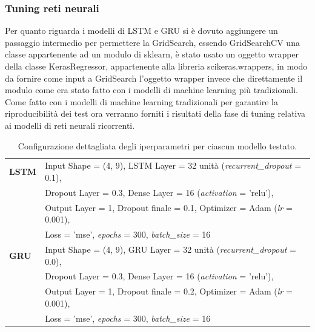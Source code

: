 \subsubsection{Tuning reti neurali}
Per quanto riguarda i modelli di LSTM e GRU si è dovuto aggiungere un passaggio intermedio per permettere la GridSearch, essendo GridSearchCV una classe appartenente ad un modulo di sklearn, è stato usato un oggetto wrapper della classe KerasRegressor, appartenente alla libreria scikeras.wrappers, in modo da fornire come input a GridSearch l'oggetto wrapper invece che direttamente il modulo come era stato fatto con i modelli di machine learning più tradizionali.\\
Come fatto con i modelli di machine learning tradizionali per garantire la riproducibilità dei test ora verranno forniti i risultati della fase di tuning relativa ai modelli di reti neurali ricorrenti.\\
\begin{table}[H]
	\centering
	\caption{Configurazione dettagliata degli iperparametri per ciascun modello testato.}
	\label{tab:Iperparametri_RNN}
	\small %
	\begin{tabular}{ll}
		\toprule
		\textbf{LSTM} & Input Shape = (4, 9), LSTM Layer = 32 unità (\textit{recurrent\_dropout} = 0.1), \\
		& Dropout Layer = 0.3, Dense Layer = 16 (\textit{activation} = 'relu'), \\
		& Output Layer = 1, Dropout finale = 0.1, Optimizer = Adam (\textit{lr} = 0.001), \\
		& Loss = 'mse', \textit{epochs} = 300, \textit{batch\_size} = 16 \\ 
		\midrule
		\textbf{GRU}  & Input Shape = (4, 9), GRU Layer = 32 unità (\textit{recurrent\_dropout} = 0.0), \\
		& Dropout Layer = 0.3, Dense Layer = 16 (\textit{activation} = 'relu'), \\
		& Output Layer = 1, Dropout finale = 0.2, Optimizer = Adam (\textit{lr} = 0.001), \\
		& Loss = 'mse', \textit{epochs} = 300, \textit{batch\_size} = 16 \\ 
		\bottomrule
	\end{tabular}
\end{table}

\label{sec:methods}